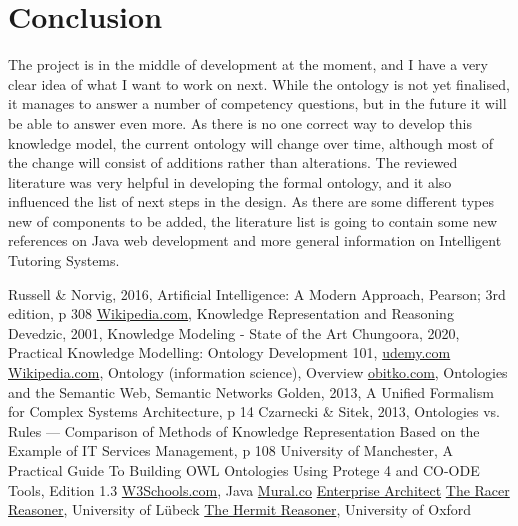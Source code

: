 \documentclass[titlepage]{article}
\begin{document}
\section{Conclusion}
The project is in the middle of development at the moment, and I have a very clear idea of what I want to work on next. While the ontology is not yet finalised, it manages to answer a number of competency questions, but in the future it will be able to answer even more. As there is no one correct way to develop this knowledge model, the current ontology will change over time, although most of the change will consist of additions rather than alterations.
\newline
The reviewed literature was very helpful in developing the formal ontology, and it also influenced the list of next steps in the design. As there are some different types new of components to be added, the literature list is going to contain some new references on Java web development and more general information on Intelligent Tutoring Systems.
\newpage

\begin{thebibliography}{99}
 Russell \& Norvig, 2016, Artificial Intelligence: A Modern Approach, Pearson; 3rd edition, p 308
 \href{https://en.wikipedia.org/wiki/Knowledge_representation_and_reasoning}{Wikipedia.com}, Knowledge Representation and Reasoning
 Devedzic, 2001, Knowledge Modeling - State of the Art 
 Chungoora, 2020, Practical Knowledge Modelling: Ontology Development 101, \href{https://www.udemy.com/course/practical-knowledge-modelling/}{udemy.com}
 \href{https://en.wikipedia.org/wiki/Ontology_(information_science)}{Wikipedia.com}, Ontology (information science), Overview
 \href{https://www.obitko.com/tutorials/ontologies-semantic-web/semantic-networks.html}{obitko.com}, Ontologies and the Semantic Web, Semantic Networks
 Golden, 2013, A Unified Formalism for Complex Systems Architecture, p 14
 Czarnecki \& Sitek, 2013, Ontologies vs. Rules — Comparison of Methods of Knowledge Representation Based on the Example of IT Services Management, p 108
 University of Manchester, A Practical Guide To Building OWL Ontologies Using Protege 4 and CO-ODE Tools, Edition 1.3
 \href{https://www.w3schools.com/java/}{W3Schools.com}, Java
\href{https://app.mural.co/}{Mural.co}
\href{https://sparxsystems.com/}{Enterprise Architect}
\href{https://www.ifis.uni-luebeck.de/~moeller/racer/}{The Racer Reasoner}, University of Lübeck
\href{http://www.hermit-reasoner.com/}{The Hermit Reasoner}, University of Oxford
\end{thebibliography}
\newpage
\end{document}
